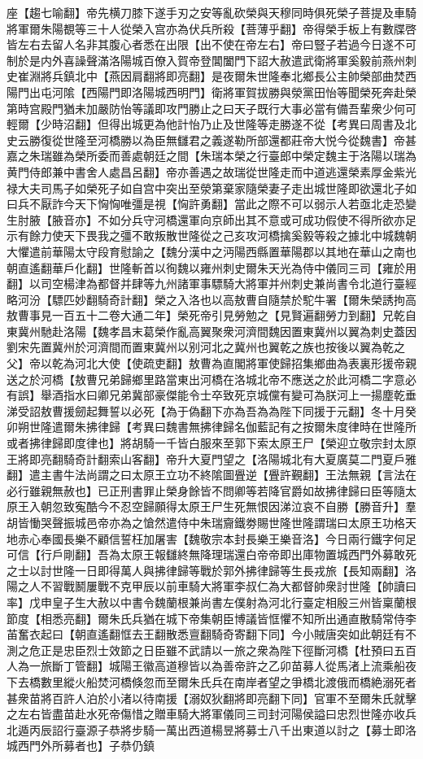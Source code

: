 座【趨七喻翻】帝先横刀膝下遂手刃之安等亂砍榮與天穆同時俱死榮子菩提及車騎將軍爾朱陽覩等三十人從榮入宫亦為伏兵所殺【菩薄乎翻】帝得榮手板上有數牒啓皆左右去留人名非其腹心者悉在出限【出不使在帝左右】帝曰豎子若過今日遂不可制於是内外喜譟聲滿洛陽城百僚入賀帝登閶闔門下詔大赦遣武衛將軍奚毅前燕州刺史崔淵將兵鎮北中【燕因肩翻將即亮翻】是夜爾朱世隆奉北鄉長公主帥榮部曲焚西陽門出屯河隂【西陽門即洛陽城西明門】衛將軍賀拔勝與滎黨田怡等聞榮死奔赴榮第時宫殿門猶未加嚴防怡等議即攻門勝止之曰天子既行大事必當有備吾輩衆少何可輕爾【少時沼翻】但得出城更為他計怡乃止及世隆等走勝遂不從【考異曰周書及北史云勝復從世隆至河橋勝以為臣無讎君之義遂勒所部還都莊帝大悦今從魏書】帝甚嘉之朱瑞雖為榮所委而善處朝廷之間【朱瑞本榮之行臺郎中榮定魏主于洛陽以瑞為黄門侍郎兼中書舍人處昌呂翻】帝亦善遇之故瑞從世隆走而中道逃還榮素厚金紫光禄大夫司馬子如榮死子如自宫中突出至滎第棄家隨榮妻子走出城世隆即欲還北子如曰兵不厭詐今天下恟恟唯彊是視【恟許勇翻】當此之際不可以弱示人若亟北走恐變生肘腋【腋音亦】不如分兵守河橋還軍向京師出其不意或可成功假使不得所欲亦足示有餘力使天下畏我之彊不敢叛散世隆從之己亥攻河橋擒奚毅等殺之據北中城魏朝大懼遣前華陽太守段育慰諭之【魏分漢中之沔陽西縣置華陽郡以其地在華山之南也朝直遙翻華戶化翻】世隆斬首以徇魏以雍州刺史爾朱天光為侍中儀同三司【雍於用翻】以司空楊津為都督并肆等九州諸軍事驃騎大將軍并州刺史兼尚書令北道行臺經略河汾【驃匹妙翻騎奇計翻】榮之入洛也以高敖曹自隨禁於駝牛署【爾朱榮誘拘高敖曹事見一百五十二卷大通二年】榮死帝引見勞勉之【見賢遍翻勞力到翻】兄乾自東冀州馳赴洛陽【魏孝昌末葛榮作亂高翼聚衆河濟間魏因置東冀州以翼為刺史蓋因劉宋先置冀州於河濟間而置東冀州以别河北之冀州也翼乾之族也按後以翼為乾之父】帝以乾為河北大使【使疏吏翻】敖曹為直閣將軍使歸招集鄉曲為表裏形援帝親送之於河橋【敖曹兄弟歸鄉里路當東出河橋在洛城北帝不應送之於此河橋二字意必有誤】舉酒指水曰卿兄弟冀部豪傑能令士卒致死京城儻有變可為朕河上一揚塵乾垂涕受詔敖曹援劒起舞誓以必死【為于偽翻下亦為吾為為陛下同援于元翻】冬十月癸卯朔世隆遣爾朱拂律歸【考異曰魏書無拂律歸名伽藍記有之按爾朱度律時在世隆所或者拂律歸即度律也】將胡騎一千皆白服來至郭下索太原王尸【榮迎立敬宗封太原王將即亮翻騎奇計翻索山客翻】帝升大夏門望之【洛陽城北有大夏廣莫二門夏戶雅翻】遣主書牛法尚謂之曰太原王立功不終隂圖舋逆【舋許覲翻】王法無親【言法在必行雖親無赦也】已正刑書罪止榮身餘皆不問卿等若降官爵如故拂律歸曰臣等隨太原王入朝忽致寃酷今不忍空歸願得太原王尸生死無恨因涕泣哀不自勝【勝音升】羣胡皆慟哭聲振城邑帝亦為之愴然遣侍中朱瑞齎鐵劵賜世隆世隆謂瑞曰太原王功格天地赤心奉國長樂不顧信誓枉加屠害【魏敬宗本封長樂王樂音洛】今日兩行鐵字何足可信【行戶剛翻】吾為太原王報讎終無降理瑞還白帝帝即出庫物置城西門外募敢死之士以討世隆一日即得萬人與拂律歸等戰於郭外拂律歸等生長戎旅【長知兩翻】洛陽之人不習戰鬭屢戰不克甲辰以前車騎大將軍李叔仁為大都督帥衆討世隆【帥讀曰率】戊申皇子生大赦以中書令魏蘭根兼尚書左僕射為河北行臺定相殷三州皆稟蘭根節度【相悉亮翻】爾朱氏兵猶在城下帝集朝臣博議皆恇懼不知所出通直散騎常侍李苖奮衣起曰【朝直遙翻恇去王翻散悉亶翻騎奇寄翻下同】今小賊唐突如此朝廷有不測之危正是忠臣烈士效節之日臣雖不武請以一旅之衆為陛下徑斷河橋【杜預曰五百人為一旅斷丁管翻】城陽王徽高道穆皆以為善帝許之乙卯苗募人從馬渚上流乘船夜下去橋數里縱火船焚河橋倏忽而至爾朱氏兵在南岸者望之爭橋北渡俄而橋絶溺死者甚衆苗將百許人泊於小渚以待南援【溺奴狄翻將即亮翻下同】官軍不至爾朱氏就擊之左右皆盡苗赴水死帝傷惜之贈車騎大將軍儀同三司封河陽侯謚曰忠烈世隆亦收兵北遁丙辰詔行臺源子恭將步騎一萬出西道楊昱將募士八千出東道以討之【募士即洛城西門外所募者也】子恭仍鎮